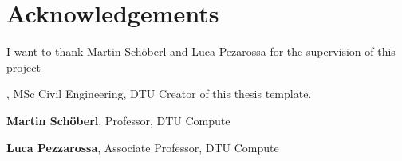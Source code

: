 \section*{Acknowledgements}

I want to thank Martin Schöberl and Luca Pezarossa for the supervision of this project

\textbf{\thesisauthor}, MSc Civil Engineering, DTU \newline
Creator of this thesis template.

\textbf{Martin Schöberl}, Professor, DTU Compute \newline
[text]

\textbf{Luca Pezzarossa}, Associate Professor, DTU Compute \newline
[text]

